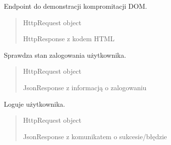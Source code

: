 \documentclass[letterpaper,11pt,polish]{sphinxmanual}
\begin{document}
\begin{fulllineitems}
\label{\detokenize{mainApp:mainApp.views.domcompromise}}
\pysigstartsignatures
{}
\pysigstopsignatures
\sphinxAtStartPar
Endpoint do demonstracji kompromitacji DOM.
\begin{quote}\begin{description}
\sphinxAtStartPar
{} \textendash{} HttpRequest object

\sphinxAtStartPar
HttpResponse z kodem HTML

\end{description}\end{quote}

\end{fulllineitems}


\begin{fulllineitems}
\label{\detokenize{mainApp:mainApp.views.islogin}}
\pysigstartsignatures
{}
\pysigstopsignatures
\sphinxAtStartPar
Sprawdza stan zalogowania użytkownika.
\begin{quote}\begin{description}
\sphinxAtStartPar
{} \textendash{} HttpRequest object

\sphinxAtStartPar
JsonResponse z informacją o zalogowaniu

\end{description}\end{quote}

\end{fulllineitems}


\begin{fulllineitems}
\label{\detokenize{mainApp:mainApp.views.login_view}}
\pysigstartsignatures
{}
\pysigstopsignatures
\sphinxAtStartPar
Loguje użytkownika.
\begin{quote}\begin{description}
\sphinxAtStartPar
{} \textendash{} HttpRequest object

\sphinxAtStartPar
JsonResponse z komunikatem o sukcesie/błędzie

\end{description}\end{quote}

\end{fulllineitems}
\end{document}
